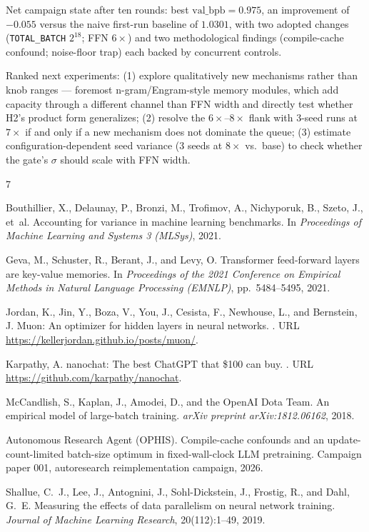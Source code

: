 \documentclass{article}
\newcommand{\valbpb}{\mathrm{val\_bpb}}
\begin{document}
Net campaign state after ten rounds: best $\valbpb = 0.975$, an improvement of $-0.055$ versus the naive first-run baseline of $1.0301$, with two adopted changes (\texttt{TOTAL\_BATCH} $2^{18}$; FFN $6\times$) and two methodological findings (compile-cache confound; noise-floor trap) each backed by concurrent controls.

Ranked next experiments: (1) explore qualitatively new mechanisms rather than knob ranges --- foremost n-gram/Engram-style memory modules, which add capacity through a different channel than FFN width and directly test whether H2's product form generalizes; (2) resolve the $6\times$--$8\times$ flank with 3-seed runs at $7\times$ if and only if a new mechanism does not dominate the queue; (3) estimate configuration-dependent seed variance (3 seeds at $8\times$ vs.\ base) to check whether the gate's $\sigma$ should scale with FFN width.



\begin{thebibliography}{7}

Bouthillier, X., Delaunay, P., Bronzi, M., Trofimov, A., Nichyporuk, B., Szeto, J., et~al.
\newblock Accounting for variance in machine learning benchmarks.
\newblock In \emph{Proceedings of Machine Learning and Systems 3 (MLSys)}, 2021.

Geva, M., Schuster, R., Berant, J., and Levy, O.
\newblock Transformer feed-forward layers are key-value memories.
\newblock In \emph{Proceedings of the 2021 Conference on Empirical Methods in Natural Language Processing (EMNLP)}, pp.\ 5484--5495, 2021.

Jordan, K., Jin, Y., Boza, V., You, J., Cesista, F., Newhouse, L., and Bernstein, J.
\newblock Muon: An optimizer for hidden layers in neural networks.
.
\newblock URL \url{https://kellerjordan.github.io/posts/muon/}.

Karpathy, A.
\newblock nanochat: The best ChatGPT that \$100 can buy.
.
\newblock URL \url{https://github.com/karpathy/nanochat}.

McCandlish, S., Kaplan, J., Amodei, D., and the OpenAI Dota Team.
\newblock An empirical model of large-batch training.
\newblock \emph{arXiv preprint arXiv:1812.06162}, 2018.

Autonomous Research Agent (OPHIS).
\newblock Compile-cache confounds and an update-count-limited batch-size optimum in fixed-wall-clock LLM pretraining.
\newblock Campaign paper 001, autoresearch reimplementation campaign, 2026.

Shallue, C.~J., Lee, J., Antognini, J., Sohl-Dickstein, J., Frostig, R., and Dahl, G.~E.
\newblock Measuring the effects of data parallelism on neural network training.
\newblock \emph{Journal of Machine Learning Research}, 20(112):1--49, 2019.

\end{thebibliography}
\end{document}
